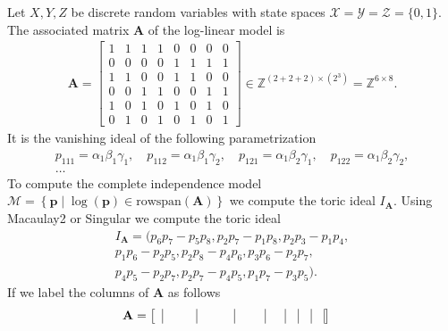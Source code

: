 \begin{eg}
  Let \( X,Y,Z \) be discrete random variables with state spaces \( \mathcal{X} = \mathcal{Y} = \mathcal{Z} = \{0, 1\} \). The associated matrix \( \mathbf A \) of the log-linear model is 
  \begin{align*}
    \mathbf A = \begin{bmatrix}
    1 & 1 & 1 & 1 & 0 & 0 & 0 & 0 \\
    0 & 0 & 0 & 0 & 1 & 1 & 1 & 1 \\
    1 & 1 & 0 & 0 & 1 & 1 & 0 & 0 \\
    0 & 0 & 1 & 1 & 0 & 0 & 1 & 1 \\
    1 & 0 & 1 & 0 & 1 & 0 & 1 & 0 \\
    0 & 1 & 0 & 1 & 0 & 1 & 0 & 1
    \end{bmatrix} \in \mathbb{Z}^{(2 + 2 + 2) \times (2^3)} = \mathbb{Z}^{6 \times 8}.
  \end{align*}
  It is the vanishing ideal of the following parametrization
  \begin{gather*}
    p_{111} = \alpha_1\beta_1\gamma_1, \quad p_{112} = \alpha_1\beta_1\gamma_2, \quad p_{121} = \alpha_1\beta_2\gamma_1, \quad p_{122} = \alpha_1\beta_2\gamma_2, \\
  \dots
  \end{gather*}
  To compute the complete independence model \( \mathcal{M} = \left\{ \mathbf p \mid \log(\mathbf p) \in \mathrm{rowspan}(\mathbf A) \right\} \) we compute the toric ideal \( I_\mathbf A \). Using Macaulay2 or Singular we compute the toric ideal 
  \begin{gather*}
    I_\mathbf A = (p_6p_7 - p_5p_8, p_2p_7 - p_1p_8 , p_2p_3- p_1p_4,\\ p_1p_6 - p_2p_5, p_2p_8 - p_4p_6, p_3p_6 - p_2p_7, \\
    p_4p_5 - p_2p_7, p_2p_7 - p_4p_5, p_1p_7 - p_3p_5 ).
  \end{gather*}
  If we label the columns of \( \mathbf A \) as follows 
  \begin{align*}
    \mathbf A &= 
    \begin{bmatrix}
      \hspace{2mm}\vline\hspace{2mm} & \hspace{4mm}\vline\hspace{4mm} & \hspace{3mm}\vline\hspace{3mm} & \hspace{2mm}\vline\hspace{2mm} & \vline & \vline & \vline & \vline \\

\end{bmatrix}
\end{align*}
\end{eg}

